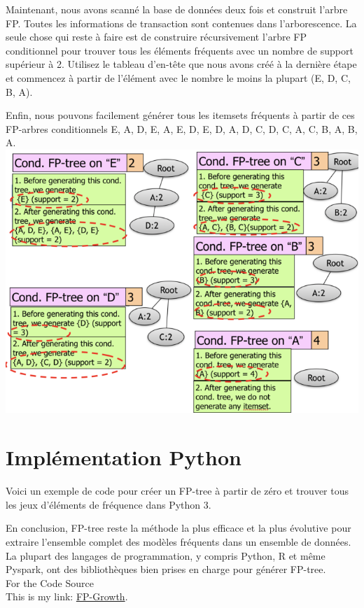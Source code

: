 \documentclass[a4paper,12pt]{article}
\begin{document}
\pagebreak

Maintenant, nous avons scanné la base de données deux fois et construit l'arbre FP. Toutes les informations de transaction sont contenues dans l'arborescence. La seule chose qui reste à faire est de construire récursivement l'arbre FP conditionnel pour trouver tous les éléments fréquents avec un nombre de support supérieur à 2. Utilisez le tableau d'en-tête que nous avons créé à la dernière étape et commencez à partir de l'élément avec le nombre le moins la plupart (E, D, C, B, A).
\begin{frame}
    {}

\end{frame}

\pagebreak

Enfin, nous pouvons facilement générer tous les itemsets fréquents à partir de ces FP-arbres conditionnels {E}, {A, D, E}, {A, E}, {D, E}, {D}, {A, D}, { C, D}, {C}, {A, C}, {B}, {A, B}, {A}.
\includegraphics[width=\textwidth]{four}

\section{Implémentation Python}
Voici un exemple de code pour créer un FP-tree à partir de zéro et trouver tous les jeux d'éléments de fréquence dans Python 3.

En conclusion, FP-tree reste la méthode la plus efficace et la plus évolutive pour extraire l'ensemble complet des modèles fréquents dans un ensemble de données. La plupart des langages de programmation, y compris Python, R et même Pyspark, ont des bibliothèques bien prises en charge pour générer FP-tree.\\
For the Code Source \\

This is my link: \href{https://github.com/IlyesBenarroum/Latex-FDD/blob/master/Src/source.py}{FP-Growth}.
\end{document}
